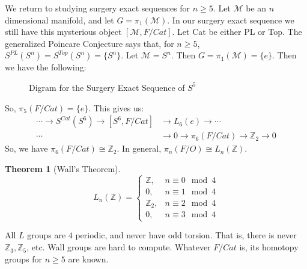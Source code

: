 \documentclass{article}
\theoremstyle{mystyle}
\newtheorem{theorem}{Theorem}[section]
\begin{document}
We return to studying surgery exact sequences for $n\geq 5$. Let $\mathcal{M}$ be an $n$ dimensional manifold, and let $G = \pi_{1}(\mathcal{M})$. In our surgery exact sequence we still have this mysterious object $[\mathcal{M},F/Cat]$. Let Cat be either PL or Top. The generalized Poincare Conjecture says that, for $n\geq 5$, $S^{PL}(S^{n}) = S^{Top}(S^{n}) = \{S^{n}\}$. Let $\mathcal{M} = S^{n}$. Then $G = \pi_{1}(\mathcal{M}) = \{e\}$. Then we have the following:
\begin{figure}[H]
    \centering
    \caption[Surgery Theory - Diagram for Sequence of $S^{5}$]{Digram for the Surgery Exact Sequence of $S^{5}$}
    \label{fig:surgery_theory_example_diagram_for_surgery_exact_sequence}
\end{figure}
So, $\pi_{5}(F/Cat) = \{e\}$. This gives us:
\begin{align*}
    \cdots \rightarrow S^{Cat}(S^{6})\rightarrow [S^{6},F/Cat] &\rightarrow L_{6}(e) \rightarrow \cdots\\
    \cdots &\rightarrow 0 \rightarrow \pi_{6}(F/Cat) \rightarrow \mathbb{Z}_{2}\rightarrow 0
\end{align*}
So, we have $\pi_{6}(F/Cat) \cong \mathbb{Z}_{2}$. In general, $\pi_{n}(F/O) \cong L_{n}(\mathbb{Z})$.
\begin{theorem}[Wall's Theorem]
\begin{equation*}
    L_{n}(\mathbb{Z}) = \begin{cases} \mathbb{Z}, & n \equiv 0 \mod 4 \\ 0, & n \equiv 1 \mod 4 \\ \mathbb{Z}_{2}, & n \equiv 2 \mod 4 \\ 0, & n \equiv 3 \mod 4 \end{cases}
\end{equation*}
\end{theorem}
All $L$ groups are $4$ periodic, and never have odd torsion. That is, there is never $\mathbb{Z}_{3},\mathbb{Z}_{5}$, etc. Wall groups are hard to compute. Whatever $F/Cat$ is, its homotopy groups for $n\geq 5$ are known.
\end{document}
